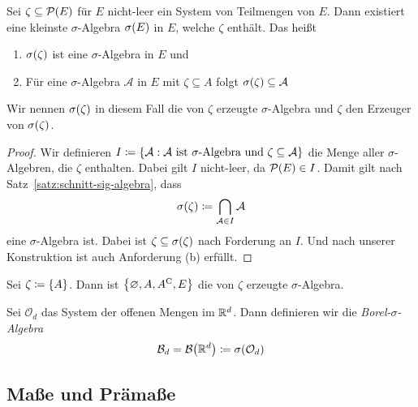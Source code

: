 \begin{satz} %
    Sei $\zeta \subseteq \mathcal{P}\of{E}$ für $E$ nicht-leer ein System von Teilmengen von $E$. Dann existiert eine kleinste $\sigma$-Algebra $\sigma\of{E}$ in $E$, welche $\zeta$ enthält. Das heißt
    \begin{enumerate}[label=(\alph*)]
        \item $\sigma\of{\zeta}$ ist eine $\sigma$-Algebra in $E$ und
        \item Für eine $\sigma$-Algebra $\mathcal{A}$ in $E$ mit $\zeta\subseteq A$ folgt $\sigma\of{\zeta} \subseteq \mathcal{A}$
    \end{enumerate}
    Wir nennen $\sigma\of{\zeta}$ in diesem Fall die von $\zeta$ erzeugte $\sigma$-Algebra und $\zeta$ den Erzeuger von $\sigma\of{\zeta}$.
    \begin{proof}
        Wir definieren $I \coloneqq \left\{\mathcal{A}: \mathcal{A} \text{ ist $\sigma$-Algebra und } \zeta\subseteq\mathcal{A}\right\}$ die Menge aller $\sigma$-Algebren, die $\zeta$ enthalten. Dabei gilt $I$ nicht-leer, da $\mathcal{P}\of{E}\in I$. Damit gilt nach Satz~\ref{satz:schnitt-sig-algebra}, dass
        \begin{align*}
            \sigma\of{\zeta} \coloneqq \bigcap_{\mathcal{A}\in I} \mathcal{A}
        \end{align*}
        eine $\sigma$-Algebra ist. Dabei ist $\zeta \subseteq \sigma\of{\zeta}$ nach Forderung an $I$. Und nach unserer Konstruktion ist auch Anforderung (b) erfüllt.
    \end{proof}
\end{satz}

\begin{beispiel}
    Sei $\zeta \coloneqq \left\{A\right\}$. Dann ist $\left\{\varnothing, A, {A}^{\mathrm{C}}, E\right\}$ die von $\zeta$ erzeugte $\sigma$-Algebra.
\end{beispiel}

\begin{definition}
    \label{definition:sigma-borel}
    Sei $\mathcal{O}_d$ das System der offenen Mengen im $\mathbb{R}^d$. Dann definieren wir die \textit{Borel-$\sigma$-Algebra}
    \begin{align*}
        \mathcal{B}_d = \mathcal{B}\of{\R^d} \coloneqq \sigma\of{\mathcal{O}_d}
    \end{align*}
\end{definition}

\subsection{Maße und Prämaße}

